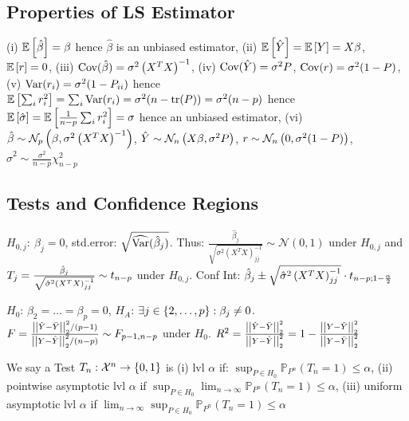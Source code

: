 \subsection{Properties of LS Estimator}
(i) $\mathbb{E}\left[ \hat{\beta} \right] = \beta$ hence $\hat{\beta}$ is an unbiased estimator,
(ii) $\mathbb{E}\left[ \hat{Y} \right] = \mathbb{E}\left[ Y \right] = X \beta$, $\mathbb{E}\left[ r \right] =0$,
(iii) $\text{Cov}(\hat{\beta}) = \sigma^2 \left( X^T X \right)^{-1}$,
(iv) $\text{Cov}(\hat{Y}) = \sigma^2 P$, $\text{Cov}(r) = \sigma^2 (1-P)$,
(v) $\text{Var}(r_i) = \sigma^2 (1-P_{ii})$ hence $\mathbb{E}\left[ \sum_i r_i^2 \right] = \sum_i \text{Var}(r_i) = \sigma^2 (n-\text{tr}(P)) = \sigma^2 (n-p)$ hence $\mathbb{E}\left[ \hat{\sigma} \right] = \mathbb{E}\left[ \frac{1}{n-p} \sum_i r_i^2 \right] = \sigma$ hence an unbiased estimator,
(vi) $\hat{\beta} \sim \mathcal{N}_p \left( \beta,\sigma^2 \left( X^T X \right)^{-1} \right)$, $\hat{Y} \sim \mathcal{N}_n \left( X \beta,\sigma^2 P \right)$, $r \sim \mathcal{N}_n \left( 0,\sigma^2 (1-P) \right)$, $\hat{\sigma}^2 \sim \frac{\sigma^2}{n-p} \chi_{n-p}^2$

\vspace{-5pt}

\subsection{Tests and Confidence Regions}
$H_{0,j}: \ \beta_j = 0$, std.error: $\sqrt{\widehat{\text{Var}}(\hat{\beta}_j)}$. Thus: $\frac{\hat{\beta}_j}{\sqrt{\sigma^2 (X^T X)_{jj}^{-1}}} \sim \mathcal{N}(0,1)$ under $H_{0,j}$ and $T_j = \frac{\hat{\beta}_j}{\sqrt{\hat{\sigma}^2 \left( X^T X \right)_{jj}^{-1}}} \sim t_{n-p}$ under $H_{0,j}$. Conf Int: $\hat{\beta}_j \pm \sqrt{\hat{\sigma}^2 \left( X^T X \right)_{jj}^{-1}} \cdot t_{n-p;1-\frac{\alpha}{2}}$

\vspace{4pt}

$H_0$: $\beta_2 = \dots = \beta_p = 0$, $H_A$: $\exists j \in \left\{ 2,\dots,p \right\}: \beta_j \neq 0$.
$F = \frac{\left\vert\left\vert \hat{Y} - \bar{Y} \right\vert\right\vert_2^2 / (p-1)}{\left\vert\left\vert Y - \hat{Y} \right\vert\right\vert_2^2 / (n-p)} \sim F_{p-1,n-p}$ under $H_0$.
$R^2 = \frac{\left\vert\left\vert \hat{Y} - \bar{Y} \right\vert\right\vert_2^2}{\left\vert\left\vert Y - \hat{Y} \right\vert\right\vert_2^2} = 1 - \frac{\left\vert\left\vert Y - \hat{Y} \right\vert\right\vert_2^2}{\left\vert\left\vert Y-\bar{Y} \right\vert\right\vert_2^2}$

\vspace{4pt}

 We say a Test $T_n : \mathcal{X}^n \rightarrow \left\{ 0,1 \right\}$ is (i) lvl $\alpha$ if: $\sup_{P \in H_0} \mathbb{P}_{P^n} (T_n = 1) \leq \alpha$, (ii) pointwise asymptotic lvl $\alpha$ if $\sup_{P \in H_0} \lim_{n \rightarrow \infty} \mathbb{P}_{P^n} (T_n = 1) \leq \alpha$, (iii) uniform asymptotic lvl $\alpha$ if $\lim_{n \rightarrow \infty} \sup_{P \in H_0} \mathbb{P}_{P^n} (T_n = 1) \leq \alpha$


